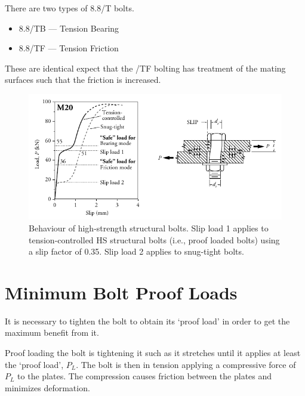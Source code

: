 There are two types of 8.8/T bolts.
\begin{itemize}
\item 8.8/TB --- Tension Bearing
\item 8.8/TF --- Tension Friction
\end{itemize}
These are identical expect that the /TF bolting has treatment of the mating surfaces such that the friction is increased.
\begin{figure}[H]
\centering
\includegraphics[width=14cm]{PIC/CH06/BLC}
\caption{Behaviour of high-strength structural bolts. Slip load 1 applies to tension-controlled HS structural bolts (i.e., proof loaded bolts) using a slip factor of 0.35. Slip load 2 applies to snug-tight bolts. \citep{Gorenc2015}}
\end{figure}
\section{Minimum Bolt Proof Loads}
It is necessary to tighten the bolt to obtain its `proof load' in order to get the maximum benefit from it.

Proof loading the bolt is tightening it such as it stretches until it applies at least the `proof load', $P_L$. The bolt is then in tension applying a compressive force of $P_L$ to the plates. The compression causes friction between the plates and minimizes deformation.

